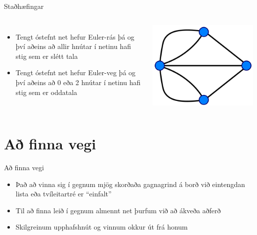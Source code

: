 \documentclass{beamer}
\begin{document}
\begin{frame}{Staðhæfingar}
\begin{columns}
\begin{itemize}
 \item Tengt óstefnt net hefur Euler-rás þá og því aðeins að allir hnútar í netinu hafi stig sem er slétt tala
 \item Tengt óstefnt net hefur Euler-veg þá og því aðeins að 0 eða 2 hnútar í netinu hafi stig sem er oddatala
\end{itemize}
\includegraphics[width=\linewidth]{Pics/konigsberg3}
\end{columns}
\end{frame}

\section{Að finna vegi}

\begin{frame}{Að finna vegi}
\begin{itemize}
 \item Það að vinna sig í gegnum mjög skorðaða gagnagrind á borð við eintengdan lista eða tvíleitartré er ``einfalt''
 \item Til að finna leið í gegnum almennt net þurfum við að ákveða aðferð
 \item Skilgreinum upphafshnút og vinnum okkur út frá honum
\end{itemize}
\end{frame}
\end{document}
